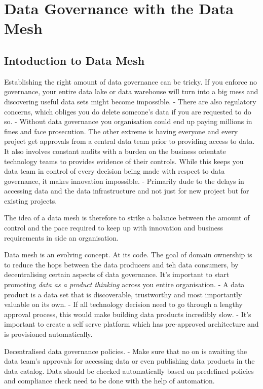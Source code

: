 \documentclass[a4paper, 11pt]{article}
\begin{document}
    \section{Data Governance with the Data Mesh}
    
    \subsection{Intoduction to Data Mesh}
    Establishing the right amount of data governance can be tricky.
    If you enforce no governance, your entire data lake or data warehouse will turn into a big mess and discovering useful data sets might become impossible.
    - There are also regulatory concerns, which obliges you do delete someone's data if you are requested to do so.
    - Without data governance you organisation could end up paying millions in fines and face prosecution.
    The other extreme is having everyone and every project get approvals from a central data team prior to providing access to data.
    It also involves constant audits with a burden on the business orientate technology teams to provides evidence of their controls.
    While this keeps you data team in control of every decision being made with respect to data governance, it makes innovation impossible.
    - Primarily dude to the delays in accessing data and the data infrastructure and not just for new project but for existing projects.

    The idea of a data mesh is therefore to strike a balance between the amount of control and the pace required to keep up with innovation and business requirements in side an organisation.

    Data mesh is an evolving concept.
    At its code.
    The goal of domain ownership is to reduce the hops between the data producers and teh data consumers, by decentralising certain aspects of data governance.
    It's important to start promoting \textit{data as a product thinking} across you entire organisation.
    - A data product is a data set that is discoverable, trustworthy and most importantly valuable on its own.
    - If all technology decision need to go through a lengthy approval process, this would make building data products incredibly slow.
    - It's important to create a self serve platform which has pre-approved architecture and is provisioned automatically.

    Decentralised data governance policies.
    - Make sure that no on is awaiting the data team's approvals for accessing data or even publishing data products in the data catalog.
    Data should be checked automatically based on predefined policies and compliance check need to be done with the help of automation.
\end{document}
